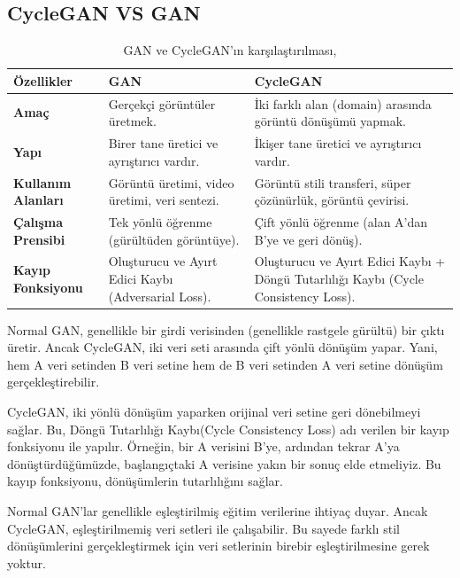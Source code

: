 \documentclass[12pt, a4paper]{article}
\begin{document}
	\subsection{CycleGAN VS GAN}
	\begin{table}[!ht]
		\centering
		\caption{GAN ve CycleGAN'ın karşılaştırılması\cite{Cycle-2024-05-29},\cite{GAN-2024-05-29}}
		\label{tab:trigo}
		\begin{tabular}{|p{4cm}|p{4cm}|p{4cm}|}
			\hline
			Özellikler& \textbf{GAN}      & \textbf{CycleGAN }        \\\hline
			\textbf{Amaç}      & Gerçekçi görüntüler üretmek.       & İki farklı alan
			(domain) arasında görüntü dönüşümü yapmak.    \\\hline
			\textbf{Yapı}     & Birer tane üretici ve ayrıştırıcı vardır.      & İkişer tane üretici ve ayrıştırıcı vardır.   \\\hline
			\textbf{Kullanım Alanları}  & Görüntü üretimi, video üretimi, veri sentezi. & Görüntü stili transferi, süper çözünürlük, görüntü çevirisi.   \\\hline
			\textbf{Çalışma Prensibi}	& 	Tek yönlü öğrenme (gürültüden görüntüye).        & Çift yönlü öğrenme (alan A'dan B'ye ve geri dönüş).            \\\hline
			\textbf{Kayıp Fonksiyonu}& Oluşturucu ve Ayırt Edici Kaybı (Adversarial Loss).         & Oluşturucu ve Ayırt Edici Kaybı + Döngü Tutarlılığı Kaybı (Cycle Consistency Loss).              \\\hline
		\end{tabular}
	\end{table}
	
	Normal GAN, genellikle bir girdi verisinden (genellikle rastgele gürültü) bir çıktı üretir. Ancak CycleGAN, iki veri seti arasında çift yönlü dönüşüm yapar. Yani, hem A veri setinden B veri setine hem de B veri setinden A veri setine dönüşüm gerçekleştirebilir.
	
	CycleGAN, iki yönlü dönüşüm yaparken orijinal veri setine geri dönebilmeyi sağlar. Bu, Döngü Tutarlılığı Kaybı(Cycle Consistency Loss) adı verilen bir kayıp fonksiyonu ile yapılır. Örneğin, bir A verisini B'ye, ardından tekrar A'ya dönüştürdüğümüzde, başlangıçtaki A verisine yakın bir sonuç elde etmeliyiz. Bu kayıp fonksiyonu, dönüşümlerin tutarlılığını sağlar.
	
	Normal GAN'lar genellikle eşleştirilmiş eğitim verilerine ihtiyaç duyar. Ancak CycleGAN, eşleştirilmemiş veri setleri ile çalışabilir. Bu sayede farklı stil dönüşümlerini gerçekleştirmek için veri setlerinin birebir eşleştirilmesine gerek yoktur.
	
\end{document}

